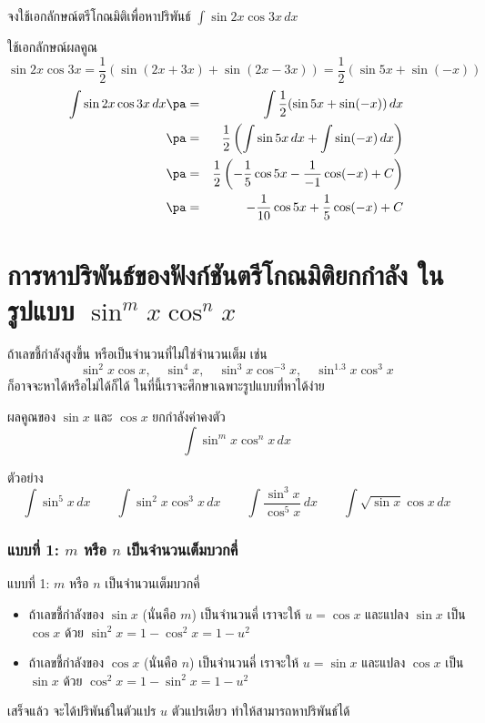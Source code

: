 \begin{frame}[t]
\begin{ex}
จงใช้เอกลักษณ์ตรีโกณมิติเพื่อหาปริพันธ์ $\int \sin 2x \cos 3x \, dx$
\end{ex} \pa
\begin{sol}
ใช้เอกลักษณ์ผลคูณ 
\[ \sin 2x \cos 3x = \frac{1}{2}(\sin (2x+3x) + \sin(2x-3x)) = \frac{1}{2}(\sin 5x + \sin (-x)) \]
\begin{eqnarray*}
\int \sin 2x \cos 3x \, dx \pa &=& \int \frac{1}{2}(\sin 5x + \sin (-x)) \, dx \\
\pa &=& \frac{1}{2} \left( \int \sin 5x \, dx + \int \sin (-x) \, dx \right) \\
\pa &=& \frac{1}{2}\left( -\frac{1}{5} \cos 5x - \frac{1}{-1} \cos (-x) + C\right) \\
\pa &=& -\frac{1}{10} \cos 5x + \frac{1}{5} \cos (-x) + C
\end{eqnarray*}
\end{sol}
\end{frame}

\section[$\sin^m x \cos^n x$]{การหาปริพันธ์ของฟังก์ชันตรีโกณมิติยกกำลัง ในรูปแบบ $\sin^m x \cos^n x$}
\frame{\sectionpage}

\begin{frame}
ถ้าเลขชี้กำลังสูงขึ้น หรือเป็นจำนวนที่ไม่ใช่จำนวนเต็ม \pa เช่น
\[ \sin^2 x \cos x, \quad \sin^4 x, \quad \sin^3 x \cos ^{-3} x, \quad \sin^{1.3} x \cos^3 x \] \pa
ก็อาจจะหาได้หรือไม่ได้ก็ได้ ในที่นี้เราจะศึกษาเฉพาะรูปแบบที่หาได้ง่าย \pa
\begin{remark}{ผลคูณของ $\sin x$ และ $\cos x$ ยกกำลังค่าคงตัว}
\[ \int \sin^m x \cos^n x \, dx\]
\end{remark} \pa
\begin{exampleblock}{ตัวอย่าง}
\[ \int \sin^5 x\, dx \qquad \int \sin^2 x \cos^3 x\, dx \qquad \int \frac{\sin^3 x}{\cos^5 x} \, dx \qquad \int \sqrt{\sin x} \cos x \, dx\]
\end{exampleblock}
\end{frame}

\begin{frame}[t]
\frametitle{แบบที่ 1: $m$ หรือ $n$ เป็นจำนวนเต็มบวกคี่}
แบบที่ 1: $m$ หรือ $n$ เป็นจำนวนเต็มบวกคี่ \pa
\begin{slide}
\begin{itemize}
\item ถ้าเลขชี้กำลังของ $\sin x$ (นั่นคือ $m$) เป็นจำนวนคี่ \pa เราจะให้ $u = \cos x$ และแปลง $\sin x$ เป็น $\cos x$ ด้วย $\sin^2 x = 1-\cos^2 x = 1-u^2$ \pa
\item ถ้าเลขชี้กำลังของ $\cos x$ (นั่นคือ $n$) เป็นจำนวนคี่ \pa เราจะให้ $u = \sin x$ และแปลง $\cos x$ เป็น $\sin x$ ด้วย $\cos^2 x = 1-\sin^2 x = 1-u^2$
\end{itemize}
เสร็จแล้ว จะได้ปริพันธ์ในตัวแปร $u$ ตัวแปรเดียว ทำให้สามารถหาปริพันธ์ได้
\end{slide}
\end{frame}



